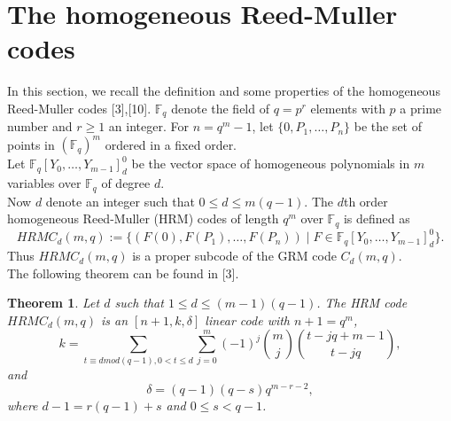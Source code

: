 \documentclass{article}
\theoremstyle{plain}
\newtheorem{thm}{Theorem}[section]
\theoremstyle{definition}
\begin{document}
\section{The homogeneous Reed-Muller codes}
In this section, we recall the definition and some properties of the homogeneous Reed-Muller codes [3],[10]. $\mathbb{F}_{q}$ denote the field of $q=p^r$ elements with $p$ a prime number and $r\geq 1$ an integer. For $n=q^m-1$, let $\{0,P_{1},\ldots ,P_{n}\}$ be the set of points in $(\mathbb{F}_{q})^m$ ordered in a fixed order.\\
Let $\mathbb{F}_{q}[Y_{0},\ldots,Y_{m-1}]_{d}^{0}$ be the vector space of homogeneous polynomials in $m$ variables over $\mathbb{F}_{q}$ of degree $d$.\\
Now $d$ denote an integer such that $0\leq d\leq m(q-1)$. The $d$th order homogeneous Reed-Muller (HRM) codes of length $q^m$ over $\mathbb{F}_{q}$ is defined as
\begin{equation}
HRMC_{d}(m,q):=\{(F(0),F(P_{1}),\ldots,F(P_{n}))\mid F\in \mathbb{F}_{q}[Y_{0},\ldots,Y_{m-1}]_{d}^{0}\}.
\end{equation}
Thus $HRMC_{d}(m,q)$ is a proper subcode of the GRM code $C_{d}(m,q)$.\\
The following theorem can be found in [3].
\begin{thm}
Let $d$ such that $1\leq d\leq (m-1)(q-1)$. The HRM code $HRMC_{d}(m,q)$ is an $[n+1,k,\delta]$ linear code with $n+1=q^m$,
\begin{equation*}
k=\sum_{t\equiv d mod(q-1),0<t\leq d}\sum_{j=0}^{m}(-1)^j \binom{m}{j}\binom{t-jq+m-1}{t-jq},
\end{equation*}
and
\begin{equation*}
\delta=(q-1)(q-s)q^{m-r-2},
\end{equation*}
where $d-1=r(q-1)+s$ and $0\leq s<q-1$.
\end{thm}
\end{document}
